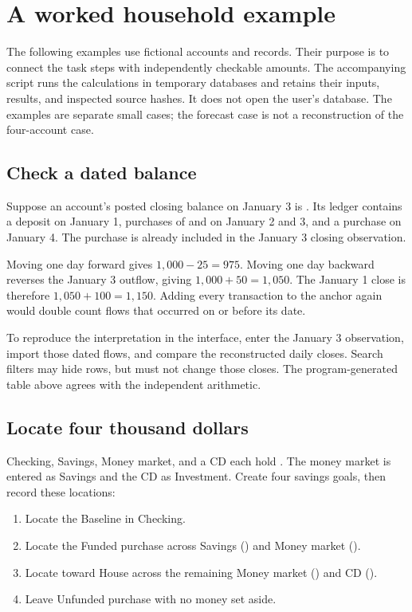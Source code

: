\chapter{A worked household example}\label{ch:examples}
The following examples use fictional accounts and records. Their purpose is to connect the task steps with independently checkable amounts. The accompanying script runs the calculations in temporary databases and retains their inputs, results, and inspected source hashes. It does not open the user's database. The examples are separate small cases; the forecast case is not a reconstruction of the four-account case.

\section{Check a dated balance}
Suppose an account's posted closing balance on January 3 is . Its ledger contains a  deposit on January 1, purchases of  and  on January 2 and 3, and a  purchase on January 4. The  purchase is already included in the January 3 closing observation.



Moving one day forward gives \(1{,}000-25=975\). Moving one day backward reverses the January 3 outflow, giving \(1{,}000+50=1{,}050\). The January 1 close is therefore \(1{,}050+100=1{,}150\). Adding every transaction to the anchor again would double count flows that occurred on or before its date.

To reproduce the interpretation in the interface, enter the January 3 observation, import those dated flows, and compare the reconstructed daily closes. Search filters may hide rows, but must not change those closes. The program-generated table above agrees with the independent arithmetic.

\section{Locate four thousand dollars}\label{sec:example-goals}
Checking, Savings, Money market, and a CD each hold . The money market is entered as Savings and the CD as Investment. Create four savings goals, then record these locations:

\begin{enumerate}
\item Locate the  Baseline in Checking.
\item Locate the  Funded purchase across Savings () and Money market ().
\item Locate  toward House across the remaining Money market () and CD ().
\item Leave Unfunded purchase with no money set aside.
\end{enumerate}

